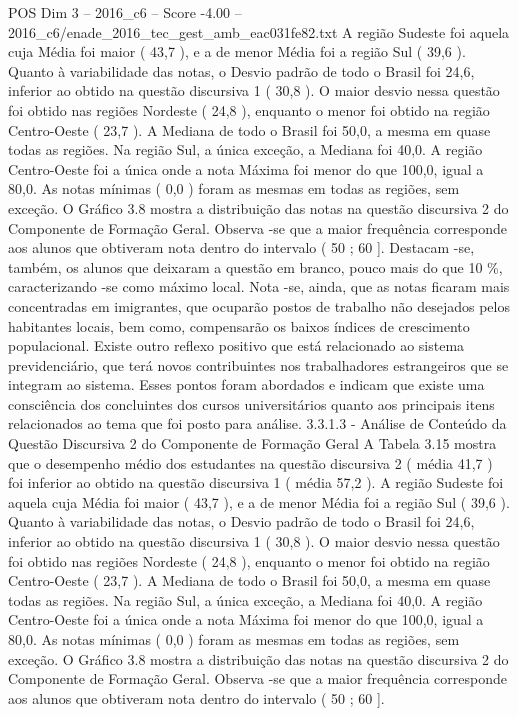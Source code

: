 \begin{textsample}{POS Dim 3 – 2016\_c6 – Score -4.00 – 2016\_c6/enade\_2016\_tec\_gest\_amb\_eac031fe82.txt}
A região Sudeste foi aquela cuja Média foi maior ( 43,7 ), e a de menor Média foi a região Sul ( 39,6 ).
Quanto à variabilidade das notas, o Desvio padrão de todo o Brasil foi 24,6, inferior ao obtido na questão discursiva 1 ( 30,8 ).
O maior desvio nessa questão foi obtido nas regiões Nordeste ( 24,8 ), enquanto o menor foi obtido na região Centro-Oeste ( 23,7 ).
A Mediana de todo o Brasil foi 50,0, a mesma em quase todas as regiões.
Na região Sul, a única exceção, a Mediana foi 40,0.
A região Centro-Oeste foi a única onde a nota Máxima foi menor do que 100,0, igual a 80,0.
As notas mínimas ( 0,0 ) foram as mesmas em todas as regiões, sem exceção.
O Gráfico 3.8 mostra a distribuição das notas na questão discursiva 2 do Componente de Formação Geral.
Observa -se que a maior frequência corresponde aos alunos que obtiveram nota dentro do intervalo ( 50 ; 60 ].
Destacam -se, também, os alunos que deixaram a questão em branco, pouco mais do que 10 \%, caracterizando -se como máximo local.
Nota -se, ainda, que as notas ficaram mais concentradas em imigrantes, que ocuparão postos de trabalho não desejados pelos habitantes locais, bem como, compensarão os baixos índices de crescimento populacional.
Existe outro reflexo positivo que está relacionado ao sistema previdenciário, que terá novos contribuintes nos trabalhadores estrangeiros que se integram ao sistema.
Esses pontos foram abordados e indicam que existe uma consciência dos concluintes dos cursos universitários quanto aos principais itens relacionados ao tema que foi posto para análise. 3.3.1.3 - Análise de Conteúdo da Questão Discursiva 2 do Componente de Formação Geral A Tabela 3.15 mostra que o desempenho médio dos estudantes na questão discursiva 2 ( média 41,7 ) foi inferior ao obtido na questão discursiva 1 ( média 57,2 ).
A região Sudeste foi aquela cuja Média foi maior ( 43,7 ), e a de menor Média foi a região Sul ( 39,6 ).
Quanto à variabilidade das notas, o Desvio padrão de todo o Brasil foi 24,6, inferior ao obtido na questão discursiva 1 ( 30,8 ).
O maior desvio nessa questão foi obtido nas regiões Nordeste ( 24,8 ), enquanto o menor foi obtido na região Centro-Oeste ( 23,7 ).
A Mediana de todo o Brasil foi 50,0, a mesma em quase todas as regiões.
Na região Sul, a única exceção, a Mediana foi 40,0.
A região Centro-Oeste foi a única onde a nota Máxima foi menor do que 100,0, igual a 80,0.
As notas mínimas ( 0,0 ) foram as mesmas em todas as regiões, sem exceção.
O Gráfico 3.8 mostra a distribuição das notas na questão discursiva 2 do Componente de Formação Geral.
Observa -se que a maior frequência corresponde aos alunos que obtiveram nota dentro do intervalo ( 50 ; 60 ].

\end{textsample}
